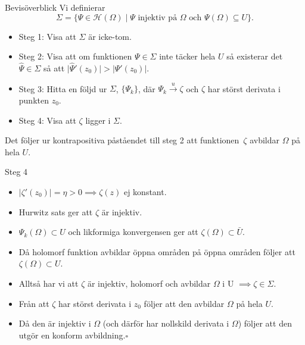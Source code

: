 \documentclass{beamer}
\renewcommand{\H}{\mathscr{H}}
\newcommand{\abs}[1]{\left\lvert #1 \right\rvert}
\begin{document}
\begin{frame}{Bevisöverblick}
Vi definierar
    \begin{equation*}
		\Sigma = \{ \Psi \in \H(\Omega) \mid \Psi \text{ injektiv på } \Omega \text{ och } \Psi(\Omega) \subseteq U\}.
    \end{equation*}
   \begin{itemize}
        \item[\(\boxtimes\)] Steg 1: Visa att $\Sigma$ är icke-tom.
        \item[\(\boxtimes\)] Steg 2: Visa att om funktionen $\Psi \in \Sigma$ inte täcker hela $U$ så existerar det $\hat{\Psi} \in \Sigma$ så att $\vert \hat{\Psi}'(z_0) \vert > \abs{\Psi'(z_0)}$.
        \item[\(\boxtimes\)] Steg 3: Hitta en följd ur $\Sigma$, $\{\Psi_k\}$, där  $\Psi_k \xrightarrow{u} \zeta$ och $\zeta$ har störst derivata i punkten $z_0$.
        \item[\(\square\)] Steg 4: Visa att $\zeta$ ligger i $\Sigma$.
    \end{itemize} 
    \vspace{0.3cm}
    Det följer ur kontrapositiva påståendet till steg 2 att funktionen~$\zeta$ avbildar $\Omega$ på hela $U$.
\end{frame}

\begin{frame}{Steg 4}
    \begin{itemize}
        \item $\abs{\zeta'(z_0)} = \eta > 0 \implies \zeta(z)$ ej konstant. 
        \item Hurwitz sats ger att $\zeta$ är injektiv.
            \vspace{0.3cm}
        \item $\Psi_k(\Omega) \subset U$ och likformiga konvergensen ger att $\zeta(\Omega) \subset \bar{U}$.
        \item Då holomorf funktion avbildar öppna områden på öppna områden följer att $\zeta(\Omega) \subset U$.

        \item Alltså har vi att $\zeta$ är injektiv, holomorf och avbildar $\Omega$ i U $\implies \zeta \in \Sigma$.
        \item Från att $\zeta$ har störst derivata i $z_0$ följer att den avbildar $\Omega$ på hela $U$. 
        \item Då den är injektiv i $\Omega$ (och därför har nollskild derivata i $\Omega$) följer att den utgör en konform avbildning.\hfill $\square$
    \end{itemize}
\end{frame}
\end{document}
